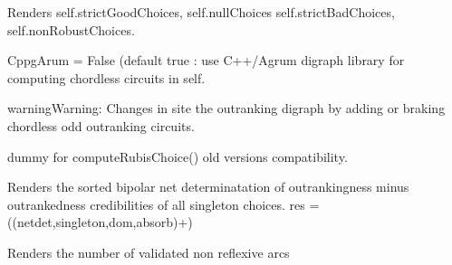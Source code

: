 \documentclass[letterpaper,10pt,english]{sphinxmanual}
\begin{document}
\begin{fulllineitems}
\begin{fulllineitems}
\end{fulllineitems}


\begin{fulllineitems}
\label{techDoc:digraphs.Digraph.computeRubisChoice}
Renders self.strictGoodChoices, self.nullChoices
self.strictBadChoices, self.nonRobustChoices.

CppgArum = False (default \textbar{} true : use C++/Agrum digraph library
for computing chordless circuits in self.

\begin{notice}{warning}{Warning:}
Changes in site the outranking digraph by
adding or braking chordless odd outranking circuits.
\end{notice}

\end{fulllineitems}


\begin{fulllineitems}
\label{techDoc:digraphs.Digraph.computeRubyChoice}
dummy for computeRubisChoice()
old versions compatibility.

\end{fulllineitems}


\begin{fulllineitems}
\label{techDoc:digraphs.Digraph.computeSingletonRanking}
Renders the sorted bipolar net determinatation of outrankingness
minus outrankedness credibilities of all singleton choices.
res = ((netdet,singleton,dom,absorb)+)

\end{fulllineitems}


\begin{fulllineitems}
\label{techDoc:digraphs.Digraph.computeSize}
Renders the number of validated non reflexive arcs


\end{fulllineitems}
\end{fulllineitems}
\end{document}
